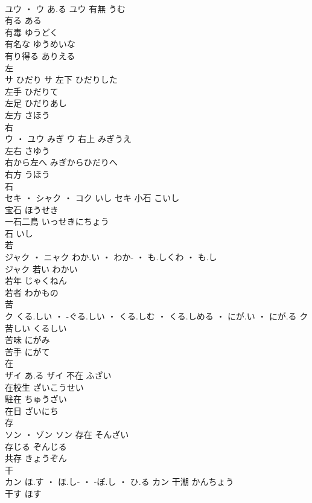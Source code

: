 \documentclass[8pt]{extreport}
\begin{document}
\begin{CJK}{UTF8}{min}
\\	ユウ ・ ウ	あ.る	ユウ	有無	うむ	
\\	有る	ある	
\\	有毒	ゆうどく	
\\	有名な	ゆうめいな	
\\	有り得る	ありえる	
\\	左	
\\	サ	ひだり	サ	左下	ひだりした	
\\	左手	ひだりて	
\\	左足	ひだりあし	
\\	左方	さほう	
\\	右	
\\	ウ ・ ユウ	みぎ	ウ	右上	みぎうえ	
\\	左右	さゆう	
\\	右から左へ	みぎからひだりへ	
\\	右方	うほう	
\\	石	
\\	セキ ・ シャク ・ コク	いし	セキ	小石	こいし	
\\	宝石	ほうせき	
\\	一石二鳥	いっせきにちょう	
\\	石	いし	
\\	若	
\\	ジャク ・ ニャク	わか.い ・ わか- ・ も.しくわ ・ も.し
\\	ジャク	若い	わかい	
\\	若年	じゃくねん	
\\	若者	わかもの	
\\	苦	
\\	ク	くる.しい ・ -ぐる.しい ・ くる.しむ ・ くる.しめる ・ にが.い ・ にが.る	ク	苦しい	くるしい	
\\	苦味	にがみ	
\\	苦手	にがて	
\\	在	
\\	ザイ	あ.る	ザイ	不在	ふざい	
\\	在校生	ざいこうせい	
\\	駐在	ちゅうざい	
\\	在日	ざいにち	
\\	存	
\\	ソン ・ ゾン		ソン	存在	そんざい	
\\	存じる	ぞんじる	
\\	共存	きょうぞん	
\\	干	
\\	カン	ほ.す ・ ほ.し- ・ -ぼ.し ・ ひ.る	カン	干潮	かんちょう	
\\	干す	ほす	

\end{CJK}
\end{document}
